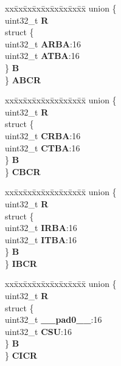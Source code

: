 \begin{DoxyCompactItemize}
\begin{tabbing}
\end{tabbing}\item 
\mbox{\label{structMLB__tag_a0bd6a0858dd2db9b65ebe41b1fec2587}} 
\begin{tabbing}
xx\=xx\=xx\=xx\=xx\=xx\=xx\=xx\=xx\=\kill
union \{\\
\>uint32\_t {\bfseries R}\\
\>struct \{\\
\>\>uint32\_t {\bfseries ARBA}:16\\
\>\>uint32\_t {\bfseries ATBA}:16\\
\>\} {\bfseries B}\\
\} {\bfseries ABCR}\\

\end{tabbing}\item 
\mbox{\label{structMLB__tag_a6e2ae57b56c556808077267b0a0a7d56}} 
\begin{tabbing}
xx\=xx\=xx\=xx\=xx\=xx\=xx\=xx\=xx\=\kill
union \{\\
\>uint32\_t {\bfseries R}\\
\>struct \{\\
\>\>uint32\_t {\bfseries CRBA}:16\\
\>\>uint32\_t {\bfseries CTBA}:16\\
\>\} {\bfseries B}\\
\} {\bfseries CBCR}\\

\end{tabbing}\item 
\mbox{\label{structMLB__tag_a7d2a0277cd2eb0eb43a295d46a3be481}} 
\begin{tabbing}
xx\=xx\=xx\=xx\=xx\=xx\=xx\=xx\=xx\=\kill
union \{\\
\>uint32\_t {\bfseries R}\\
\>struct \{\\
\>\>uint32\_t {\bfseries IRBA}:16\\
\>\>uint32\_t {\bfseries ITBA}:16\\
\>\} {\bfseries B}\\
\} {\bfseries IBCR}\\

\end{tabbing}\item 
\mbox{\label{structMLB__tag_a0d646bd07a7742694fe6144795e413cb}} 
\begin{tabbing}
xx\=xx\=xx\=xx\=xx\=xx\=xx\=xx\=xx\=\kill
union \{\\
\>uint32\_t {\bfseries R}\\
\>struct \{\\
\>\>uint32\_t {\bfseries \_\_pad0\_\_}:16\\
\>\>uint32\_t {\bfseries CSU}:16\\
\>\} {\bfseries B}\\
\} {\bfseries CICR}\\


\end{tabbing}
\end{DoxyCompactItemize}
